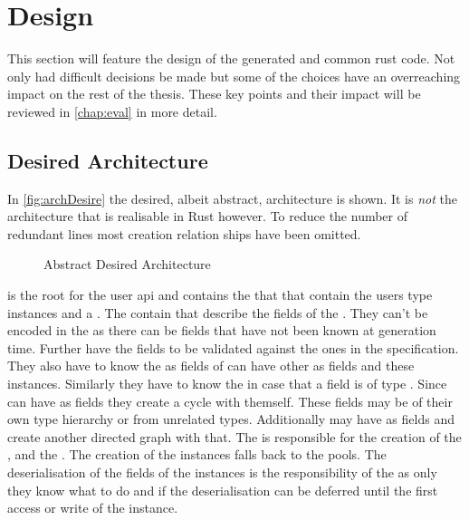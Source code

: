 \documentclass[thesis]{subfiles}
\begin{document}
\chapter{Design}
This section will feature the design of the generated and common rust code.
Not only had difficult decisions be made but some of the choices have an overreaching impact on the rest of the thesis.
These key points and their impact will be reviewed in \autoref{chap:eval} in more detail.

\section{Desired Architecture}
  In \autoref{fig:archDesire} the desired, albeit abstract, architecture is shown.
  It is \emph{not} the architecture that is realisable in Rust however.
  To reduce the number of redundant lines most creation relation ships have been omitted.

  \begin{figure}[ht]
    \centering
    
    \caption{Abstract Desired Architecture}\label{fig:archDesire}
  \end{figure}

  \SkillFile is the root for the user \gls{api} and contains the \UserTypePools that that contain the users type instances and a \StringPool.
  The \UserTypePools contain \FieldDefinitions that describe the fields of the \UserType.
  They can't be encoded in the \UserTypePools as there can be fields that have not been known at generation time.
  Further have the fields to be validated against the ones in the specification.
  They also have to know the \UserTypePools as fields of \UserTypes can have other \UserTypes as fields and these instances.
  Similarly they have to know the \StringPool in case that a field is of type \String.
  Since \UserTypes can have \UserTypes as fields they create a cycle with themself.
  These fields may be of their own type hierarchy or from unrelated types.
  Additionally \UserTypes may have \Strings as fields and create another directed graph with that.
  The \FileReader is responsible for the creation of the \StringPool, \UserTypePools and the \FieldDeclarations.
  The creation of the instances falls back to the pools.
  The deserialisation of the fields of the instances is the responsibility of the \FieldDefinitions as only they know what to do and if the deserialisation can be deferred until the first access or write of the instance.
\end{document}
